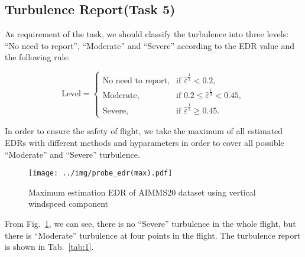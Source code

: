 \documentclass[runningheads]{llncs}
\begin{document}
\subsection{Turbulence Report(Task 5)}

As requirement of the task, we should classify the turbulence into three levels: “No need to report”, “Moderate” and “Severe” according to the EDR value 
and the following rule:

\begin{equation}
    \text{Level} = 
    \begin{cases}
        \text{No need to report}, & \text{if } \hat{\varepsilon}^{\frac13} < 0.2, \\
        \text{Moderate}, & \text{if } 0.2 \leq \hat{\varepsilon}^{\frac13} < 0.45, \\
        \text{Severe}, & \text{if } \hat{\varepsilon}^{\frac13} \geq 0.45.
    \end{cases}
\end{equation}

In order to ensure the safety of flight, we take the maximum of all estimated EDRs with different methods and hyparameters in order to cover all possible “Moderate” and “Severe” turbulence.

\begin{figure}[!htbp]
    \centering
    \texttt{[image: ../img/probe\_edr(max).pdf]}
    \caption{Maximum estimation EDR of AIMMS20 dataset using vertical windspeed component}
    \label{fig:7}
\end{figure}

From Fig.~\ref{fig:7}, we can see, there is no “Severe” turbulence in the whole flight, but there is “Moderate” turbulence at four points in the flight.
The turbulence report is shown in Tab.~\ref{tab:1}.

\end{document}
